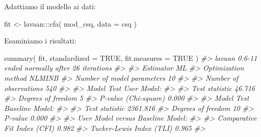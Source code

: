 \documentclass[
  11pt,
]{krantz}
\makeatletter
\newenvironment{Shaded}{\begin{snugshade}}{\end{snugshade}}
\newcommand{\AttributeTok}[1]{\textcolor[rgb]{0.61,0.61,0.61}{#1}}
\newcommand{\CommentTok}[1]{\textcolor[rgb]{0.37,0.37,0.37}{\textit{#1}}}
\newcommand{\ConstantTok}[1]{\textcolor[rgb]{0,0,0}{#1}}
\newcommand{\FunctionTok}[1]{\textcolor[rgb]{0,0,0}{#1}}
\newcommand{\NormalTok}[1]{#1}
\newcommand{\OtherTok}[1]{\textcolor[rgb]{0.37,0.37,0.37}{#1}}
\newcommand{\SpecialCharTok}[1]{\textcolor[rgb]{0,0,0}{#1}}
\newenvironment{kframe}{%
\medskip{}
\setlength{\fboxsep}{.8em}
 \def\at@end@of@kframe{}%
 \ifinner\ifhmode%
  \def\at@end@of@kframe{\end{minipage}}%
  \begin{minipage}{\columnwidth}%
 \fi\fi%
 \def\FrameCommand##1{\hskip\@totalleftmargin \hskip-\fboxsep
 \colorbox{shadecolor}{##1}\hskip-\fboxsep
     \hskip-\linewidth \hskip-\@totalleftmargin \hskip\columnwidth}%
 \MakeFramed {\advance\hsize-\width
   \@totalleftmargin\z@ \linewidth\hsize
   \@setminipage}}%
 {\par\unskip\endMakeFramed%
 \at@end@of@kframe}
\renewenvironment{Shaded}{\begin{kframe}}{\end{kframe}}
\theoremstyle{definition}
\theoremstyle{definition}
\theoremstyle{definition}
\theoremstyle{definition}
\theoremstyle{remark}
\makeatother
\begin{document}
Adattiamo il modello ai dati:

\begin{Shaded}
\begin{Highlighting}[]
\NormalTok{fit }\OtherTok{\textless{}{-}}\NormalTok{ lavaan}\SpecialCharTok{:::}\FunctionTok{cfa}\NormalTok{(}
\NormalTok{  mod\_csq,}
  \AttributeTok{data =}\NormalTok{ csq}
\NormalTok{)}
\end{Highlighting}
\end{Shaded}

Esaminiamo i risultati:

\begin{Shaded}
\begin{Highlighting}[]
\FunctionTok{summary}\NormalTok{(}
\NormalTok{  fit,}
  \AttributeTok{standardized =} \ConstantTok{TRUE}\NormalTok{,}
  \AttributeTok{fit.measures =} \ConstantTok{TRUE}
\NormalTok{)}
\CommentTok{\#\textgreater{} lavaan 0.6{-}11 ended normally after 26 iterations}
\CommentTok{\#\textgreater{} }
\CommentTok{\#\textgreater{}   Estimator                                         ML}
\CommentTok{\#\textgreater{}   Optimization method                           NLMINB}
\CommentTok{\#\textgreater{}   Number of model parameters                        10}
\CommentTok{\#\textgreater{}                                                       }
\CommentTok{\#\textgreater{}   Number of observations                           540}
\CommentTok{\#\textgreater{}                                                       }
\CommentTok{\#\textgreater{} Model Test User Model:}
\CommentTok{\#\textgreater{}                                                       }
\CommentTok{\#\textgreater{}   Test statistic                                46.716}
\CommentTok{\#\textgreater{}   Degrees of freedom                                 5}
\CommentTok{\#\textgreater{}   P{-}value (Chi{-}square)                           0.000}
\CommentTok{\#\textgreater{} }
\CommentTok{\#\textgreater{} Model Test Baseline Model:}
\CommentTok{\#\textgreater{} }
\CommentTok{\#\textgreater{}   Test statistic                              2361.816}
\CommentTok{\#\textgreater{}   Degrees of freedom                                10}
\CommentTok{\#\textgreater{}   P{-}value                                        0.000}
\CommentTok{\#\textgreater{} }
\CommentTok{\#\textgreater{} User Model versus Baseline Model:}
\CommentTok{\#\textgreater{} }
\CommentTok{\#\textgreater{}   Comparative Fit Index (CFI)                    0.982}
\CommentTok{\#\textgreater{}   Tucker{-}Lewis Index (TLI)                       0.965}
\CommentTok{\#\textgreater{} }

\end{Highlighting}
\end{Shaded}
\end{document}
